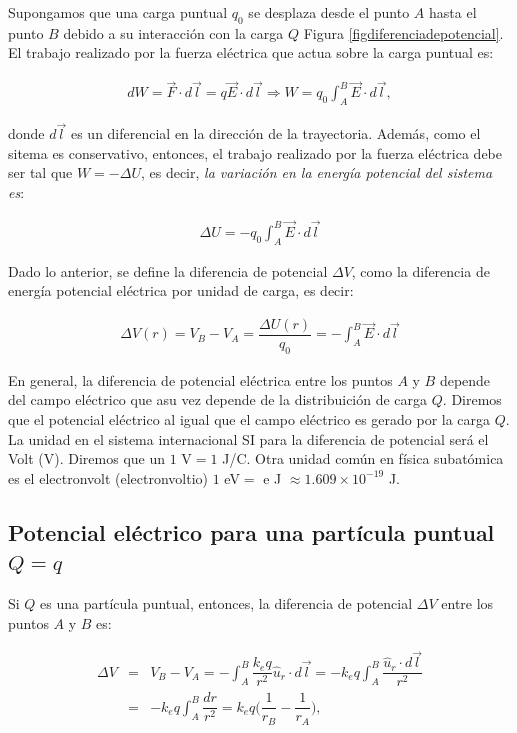 Supongamos que una carga puntual $q_0$ se desplaza desde el punto $A$ hasta el punto $B$ debido a su interacción con la carga $Q$ Figura \ref{figdiferenciadepotencial}. El trabajo realizado por la fuerza eléctrica que actua sobre la carga puntual es:

\begin{eqnarray}
dW=\vec{F}\cdot d\vec{l}= q\vec{E}\cdot d\vec{l} \Rightarrow W = q_0 \int_A^B \vec{E}\cdot d\vec{l} ,
\end{eqnarray}

donde $d\vec{l}$ es un diferencial en la dirección de la trayectoria. Además, como el sitema es conservativo, entonces, el trabajo realizado por la fuerza eléctrica debe ser tal que $W=-\Delta U$, es decir, \textit{la variación en la energía potencial del sistema es}:

\begin{eqnarray}
\boxed{\Delta U=-q_0 \int_A^B \vec{E}\cdot d\vec{l} }
\end{eqnarray}

Dado lo anterior, se define la diferencia de potencial $\Delta V$, como la diferencia de energía potencial eléctrica por unidad de carga, es decir:

\begin{eqnarray}
\boxed{\Delta V(r)=V_B-V_A = \dfrac{\Delta U(r)}{q_0} = - \int_A^B \vec{E}\cdot d\vec{l} }
\end{eqnarray}

En general, la diferencia de potencial eléctrica entre los puntos $A$ y $B$ depende del campo eléctrico que asu vez depende de la distribuición de carga $Q$. Diremos que el potencial eléctrico al igual que el campo eléctrico es gerado por la carga $Q$.
La unidad en el sistema internacional SI para la diferencia de potencial será el Volt (V). Diremos que un $1$ V$= 1$ J/C. Otra unidad común en física subatómica es el electronvolt (electronvoltio) $1$ eV$=$ e J $\approx 1.609 \times 10^{-19}$ J.

\subsection{Potencial eléctrico para una partícula puntual $Q=q$}
Si $Q$ es una partícula puntual, entonces, la diferencia de potencial $\Delta V$ entre los puntos $A$ y $B$ es:

\begin{eqnarray}
\Delta V&=&V_B-V_A =-\int_A^B \dfrac{k_eq}{r^2}\hat{u}_r \cdot d\vec{l} =-k_eq\int_A^B \dfrac{\hat{u}_r \cdot d\vec{l}}{r^2} \\ 
&=&-k_eq\int_A^B \dfrac{dr}{r^2}=k_eq \bigg(\dfrac{1}{r_B}-\dfrac{1}{r_A} \bigg),
\end{eqnarray}

